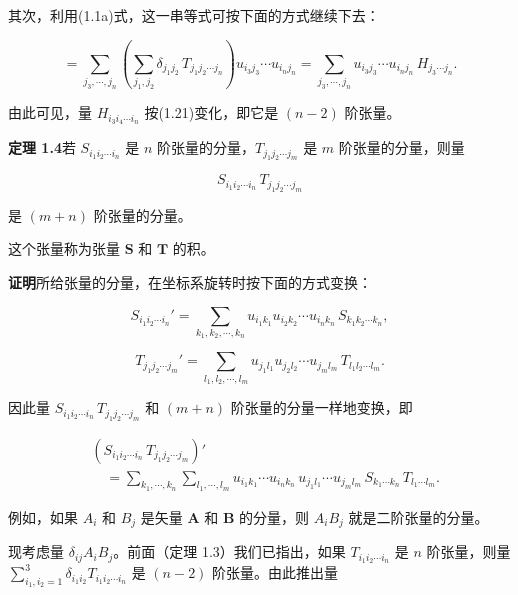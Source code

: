 \documentclass[11pt,a4paper,oneside]{ctexbook}
\newcommand{\ve}[1]{\bm{#1}}
\begin{document}
其次，利用(1.1a)式，这一串等式可按下面的方式继续下去：

\begin{equation*}
= \sum_{j_3, \cdots, j_n} \left(\sum_{j_1, j_2} \delta_{j_1 j_2}\, T_{j_1 j_2 \cdots j_n}\right) u_{i_3 j_3} \cdots u_{i_n j_n}
= \sum_{j_3, \cdots, j_n} u_{i_3 j_3} \cdots u_{i_n j_n}\, H_{j_3 \cdots j_n}.
\end{equation*}

由此可见，量 $H_{i_3 i_4 \cdots i_n}$ 按(1.21)变化，即它是 $(n - 2)$ 阶张量。

\textbf{定理 1.4}\quad 若 $S_{i_1 i_2 \cdots i_n}$ 是 $n$ 阶张量的分量，$T_{j_1 j_2 \cdots j_m}$ 是 $m$ 阶张量的分量，则量

\begin{equation*}
S_{i_1 i_2 \cdots i_n}\, T_{j_1 j_2 \cdots j_m}
\end{equation*}

是 $(m + n)$ 阶张量的分量。

这个张量称为张量 $\ve{S}$ 和 $\ve{T}$ 的积。

\textbf{证明}\quad 所给张量的分量，在坐标系旋转时按下面的方式变换：

\begin{equation*}
S_{i_1 i_2 \cdots i_n}' = \sum_{k_1, k_2, \cdots, k_n} u_{i_1 k_1} u_{i_2 k_2} \cdots u_{i_n k_n}\, S_{k_1 k_2 \cdots k_n},
\end{equation*}

\begin{equation*}
T_{j_1 j_2 \cdots j_m}' = \sum_{l_1, l_2, \cdots, l_m} u_{j_1 l_1} u_{j_2 l_2} \cdots u_{j_m l_m}\, T_{l_1 l_2 \cdots l_m}.
\end{equation*}

因此量 $S_{i_1 i_2 \cdots i_n}\, T_{j_1 j_2 \cdots j_m}$ 和 $(m + n)$ 阶张量的分量一样地变换，即

\begin{equation*}
\begin{aligned}
&(S_{i_1 i_2 \cdots i_n}\, T_{j_1 j_2 \cdots j_m})'\\
&\quad = \sum_{k_1, \cdots, k_n} \sum_{l_1, \cdots, l_m} u_{i_1 k_1} \cdots u_{i_n k_n}\, u_{j_1 l_1} \cdots u_{j_m l_m}\, S_{k_1 \cdots k_n}\, T_{l_1 \cdots l_m}.
\end{aligned}
\end{equation*}

例如，如果 $A_i$ 和 $B_j$ 是矢量 $\ve{A}$ 和 $\ve{B}$ 的分量，则 $A_i B_j$ 就是二阶张量的分量。

现考虑量 $\delta_{ij} A_i B_j$。前面（定理 1.3）我们已指出，如果 $T_{i_1 i_2 \cdots i_n}$ 是 $n$ 阶张量，则量 $\sum_{i_1, i_2 = 1}^{3} \delta_{i_1 i_2} T_{i_1 i_2 \cdots i_n}$ 是 $(n - 2)$ 阶张量。由此推出量
\end{document}
